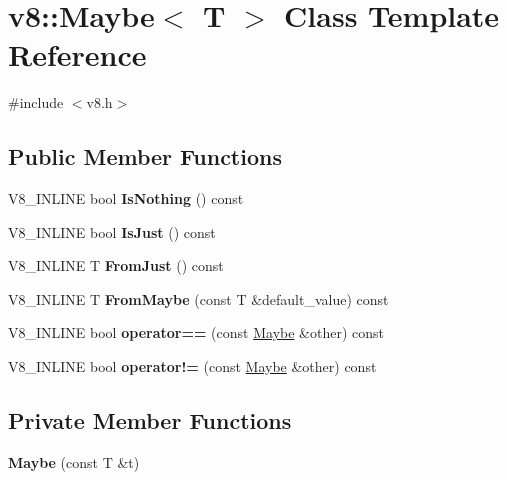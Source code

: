 \hypertarget{classv8_1_1_maybe}{}\section{v8\+:\+:Maybe$<$ T $>$ Class Template Reference}
\label{classv8_1_1_maybe}


{\ttfamily \#include $<$v8.\+h$>$}

\subsection*{Public Member Functions}
\begin{DoxyCompactItemize}
\item 
V8\+\_\+\+I\+N\+L\+I\+NE bool {\bfseries Is\+Nothing} () const \hypertarget{classv8_1_1_maybe_a486b608c21c8038d5019bd7d75866345}{}\label{classv8_1_1_maybe_a486b608c21c8038d5019bd7d75866345}

\item 
V8\+\_\+\+I\+N\+L\+I\+NE bool {\bfseries Is\+Just} () const \hypertarget{classv8_1_1_maybe_adc82dc945891060d312fb6fbf8fb56ae}{}\label{classv8_1_1_maybe_adc82dc945891060d312fb6fbf8fb56ae}

\item 
V8\+\_\+\+I\+N\+L\+I\+NE T {\bfseries From\+Just} () const \hypertarget{classv8_1_1_maybe_a02b19d7fcb7744d8dba3530ef8e14c8c}{}\label{classv8_1_1_maybe_a02b19d7fcb7744d8dba3530ef8e14c8c}

\item 
V8\+\_\+\+I\+N\+L\+I\+NE T {\bfseries From\+Maybe} (const T \&default\+\_\+value) const \hypertarget{classv8_1_1_maybe_a0bcb5fb0d0e92a3f0cc546f11068a8df}{}\label{classv8_1_1_maybe_a0bcb5fb0d0e92a3f0cc546f11068a8df}

\item 
V8\+\_\+\+I\+N\+L\+I\+NE bool {\bfseries operator==} (const \hyperlink{classv8_1_1_maybe}{Maybe} \&other) const \hypertarget{classv8_1_1_maybe_adf61111c2da44e10ba5ab546a9a525ce}{}\label{classv8_1_1_maybe_adf61111c2da44e10ba5ab546a9a525ce}

\item 
V8\+\_\+\+I\+N\+L\+I\+NE bool {\bfseries operator!=} (const \hyperlink{classv8_1_1_maybe}{Maybe} \&other) const \hypertarget{classv8_1_1_maybe_a5bbacc606422d7ab327c2683462342ec}{}\label{classv8_1_1_maybe_a5bbacc606422d7ab327c2683462342ec}

\end{DoxyCompactItemize}
\subsection*{Private Member Functions}
\begin{DoxyCompactItemize}
\item 
{\bfseries Maybe} (const T \&t)\hypertarget{classv8_1_1_maybe_a29ee108b5096f09e1e69b18ffc3c60cc}{}\label{classv8_1_1_maybe_a29ee108b5096f09e1e69b18ffc3c60cc}

\end{DoxyCompactItemize}
